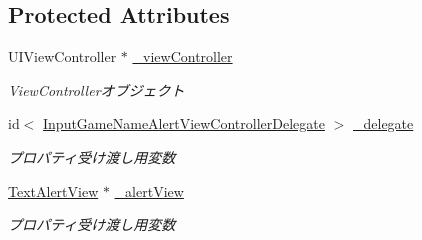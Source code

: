 \subsection*{Protected Attributes}
\begin{DoxyCompactItemize}
\item 
\hypertarget{interface_input_game_name_alert_view_controller_a030d00687c3db793f87e045e8cdc2abf}{
UIViewController $\ast$ \hyperlink{interface_input_game_name_alert_view_controller_a030d00687c3db793f87e045e8cdc2abf}{\_\-viewController}}
\label{interface_input_game_name_alert_view_controller_a030d00687c3db793f87e045e8cdc2abf}

\begin{DoxyCompactList}\small\item\em ViewControllerオブジェクト \end{DoxyCompactList}\item 
\hypertarget{interface_input_game_name_alert_view_controller_ad48438a5fec152c0c75bc83fa3596b45}{
id$<$ \hyperlink{protocol_input_game_name_alert_view_controller_delegate-p}{InputGameNameAlertViewControllerDelegate} $>$ \hyperlink{interface_input_game_name_alert_view_controller_ad48438a5fec152c0c75bc83fa3596b45}{\_\-delegate}}
\label{interface_input_game_name_alert_view_controller_ad48438a5fec152c0c75bc83fa3596b45}

\begin{DoxyCompactList}\small\item\em プロパティ受け渡し用変数 \end{DoxyCompactList}\item 
\hypertarget{interface_input_game_name_alert_view_controller_ae111feaba92c85476a162a55471c7fe4}{
\hyperlink{interface_text_alert_view}{TextAlertView} $\ast$ \hyperlink{interface_input_game_name_alert_view_controller_ae111feaba92c85476a162a55471c7fe4}{\_\-alertView}}
\label{interface_input_game_name_alert_view_controller_ae111feaba92c85476a162a55471c7fe4}

\begin{DoxyCompactList}\small\item\em プロパティ受け渡し用変数 \end{DoxyCompactList}\end{DoxyCompactItemize}

